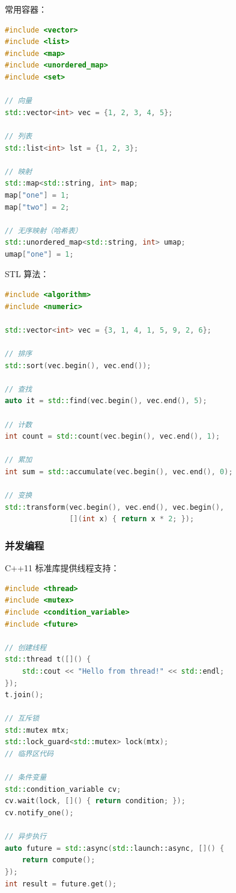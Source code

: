 
常用容器：
\begin{lstlisting}[language=C++]
#include <vector>
#include <list>
#include <map>
#include <unordered_map>
#include <set>

// 向量
std::vector<int> vec = {1, 2, 3, 4, 5};

// 列表
std::list<int> lst = {1, 2, 3};

// 映射
std::map<std::string, int> map;
map["one"] = 1;
map["two"] = 2;

// 无序映射（哈希表）
std::unordered_map<std::string, int> umap;
umap["one"] = 1;
\end{lstlisting}

STL 算法：
\begin{lstlisting}[language=C++]
#include <algorithm>
#include <numeric>

std::vector<int> vec = {3, 1, 4, 1, 5, 9, 2, 6};

// 排序
std::sort(vec.begin(), vec.end());

// 查找
auto it = std::find(vec.begin(), vec.end(), 5);

// 计数
int count = std::count(vec.begin(), vec.end(), 1);

// 累加
int sum = std::accumulate(vec.begin(), vec.end(), 0);

// 变换
std::transform(vec.begin(), vec.end(), vec.begin(),
               [](int x) { return x * 2; });
\end{lstlisting}

\subsubsection{并发编程}


C++11 标准库提供线程支持：

\begin{lstlisting}[language=C++]
#include <thread>
#include <mutex>
#include <condition_variable>
#include <future>

// 创建线程
std::thread t([]() {
    std::cout << "Hello from thread!" << std::endl;
});
t.join();

// 互斥锁
std::mutex mtx;
std::lock_guard<std::mutex> lock(mtx);
// 临界区代码

// 条件变量
std::condition_variable cv;
cv.wait(lock, []() { return condition; });
cv.notify_one();

// 异步执行
auto future = std::async(std::launch::async, []() {
    return compute();
});
int result = future.get();
\end{lstlisting}

